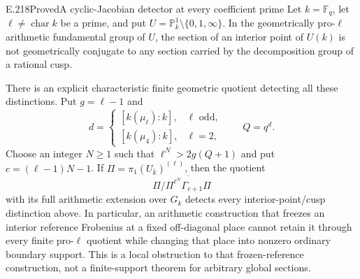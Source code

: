 
\begin{result}{E.218}{Proved}{A cyclic-Jacobian detector at every coefficient prime}
Let $k=\mathbb F_q$, let $\ell\ne\operatorname{char}k$ be a prime, and put
$U=\mathbb P^1_k\setminus\{0,1,\infty\}$. In the geometrically pro-$\ell$
arithmetic fundamental group of $U$, the section of an interior point of
$U(k)$ is not geometrically conjugate to any section carried by the
 decomposition group of a rational cusp.

There is an explicit characteristic finite geometric quotient detecting all
these distinctions. Put $g=\ell-1$ and
\[
 d=\begin{cases}[k(\mu_\ell):k],&\ell\text{ odd},\\
 [k(\mu_4):k],&\ell=2,\end{cases}
 \qquad Q=q^d.
 \tag{E.218.1}
\]
Choose an integer $N\ge1$ such that $\ell^N>2g(Q+1)$ and put
$c=(\ell-1)N-1$. If $\Pi=\pi_1(U_{\bar k})^{(\ell)}$, then the quotient
\[
 \Pi\big/\overline{\Pi^{\ell^N}\Gamma_{c+1}\Pi}
 \tag{E.218.2}
\]
with its full arithmetic extension over $G_k$ detects every interior-point/cusp
distinction above. In particular, an arithmetic construction that freezes an
interior reference Frobenius at a fixed off-diagonal place cannot retain it
through every finite pro-$\ell$ quotient while changing that place into
nonzero ordinary boundary support. This is a local obstruction to that
frozen-reference construction, not a finite-support theorem for arbitrary
global sections.
\end{result}

